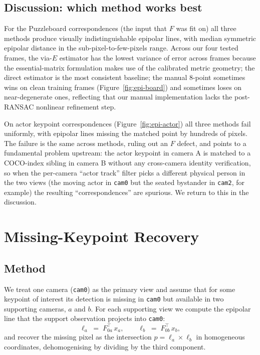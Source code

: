 \documentclass[twocolumn]{article}
\newcommand{\cam}[1]{\texttt{cam#1}}
\begin{document}
\subsection{Discussion: which method works best}

For the Puzzleboard correspondences (the input that $F$ was fit on)
all three methods produce visually indistinguishable epipolar lines,
with median symmetric epipolar distance in the sub-pixel-to-few-pixels
range. Across our four tested frames, the via-$E$ estimator has the
lowest variance of error across frames because the essential-matrix
formulation makes use of the calibrated metric geometry; the direct
estimator is the most consistent baseline; the manual 8-point
sometimes wins on clean training frames (Figure~\ref{fig:epi-board})
and sometimes loses on near-degenerate ones, reflecting that our
manual implementation lacks the post-RANSAC nonlinear refinement
step.

On actor keypoint correspondences (Figure~\ref{fig:epi-actor}) all
three methods fail uniformly, with epipolar lines missing the
matched point by hundreds of pixels. The failure is the same across
methods, ruling out an $F$ defect, and points to a fundamental
problem upstream: the actor keypoint in camera A is matched to a
COCO-index sibling in camera B without any cross-camera identity
verification, so when the per-camera ``actor track'' filter picks a
different physical person in the two views (the moving actor in
\cam{0} but the seated bystander in \cam{2}, for example) the resulting
``correspondences'' are spurious. We return to this in the
discussion.

\section{Missing-Keypoint Recovery}
\label{sec:recovery}

\subsection{Method}

We treat one camera (\cam{0}) as the primary view and assume that for
some keypoint of interest its detection is missing in \cam{0} but
available in two supporting cameras, $a$ and $b$. For each
supporting view we compute the epipolar line that the support
observation projects into \cam{0}:
\begin{equation}
\ell_a \;=\; F_{0a}^{\top}\, x_a,
\qquad
\ell_b \;=\; F_{0b}^{\top}\, x_b,
\label{eq:epi-recovery}
\end{equation}
and recover the missing pixel as the intersection
$p = \ell_a \times \ell_b$ in homogeneous coordinates,
dehomogenising by dividing by the third component.
\end{document}
